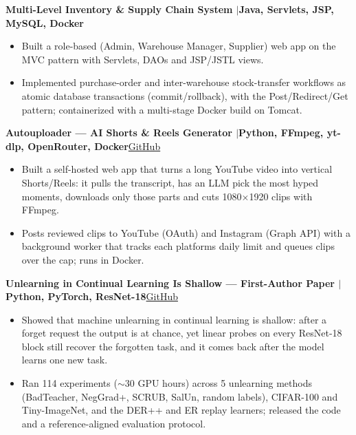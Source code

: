 \documentclass[10pt,a4paper]{article}
\newcommand{\entry}[2]{\par\textbf{#1}\hfill #2\par}
\newenvironment{points}{\vspace{-4pt}\begin{itemize}\setlength{\itemsep}{0pt}\setlength{\parskip}{0pt}\setlength{\topsep}{0pt}\setlength{\partopsep}{0pt}\setlength{\leftmargin}{12pt}}{\end{itemize}\vspace{-2pt}}
\newcommand{\sep}{\enspace$|$\enspace}
\begin{document}
\entry{Multi-Level Inventory \& Supply Chain System \textnormal{\sep Java, Servlets, JSP, MySQL, Docker}}{}
\begin{points}
  \item Built a role-based (Admin, Warehouse Manager, Supplier) web app on the MVC pattern with Servlets, DAOs and JSP/JSTL views.
  \item Implemented purchase-order and inter-warehouse stock-transfer workflows as atomic database transactions (commit/rollback), with the Post/Redirect/Get pattern; containerized with a multi-stage Docker build on Tomcat.
\end{points}

\entry{Autouploader --- AI Shorts \& Reels Generator \textnormal{\sep Python, FFmpeg, yt-dlp, OpenRouter, Docker}}{\href{https://github.com/Adarshmilan/autouploader}{GitHub}}
\begin{points}
  \item Built a self-hosted web app that turns a long YouTube video into vertical Shorts/Reels: it pulls the transcript, has an LLM pick the most hyped moments, downloads only those parts and cuts 1080$\times$1920 clips with FFmpeg.
  \item Posts reviewed clips to YouTube (OAuth) and Instagram (Graph API) with a background worker that tracks each platforms daily limit and queues clips over the cap; runs in Docker.
\end{points}
\entry{Unlearning in Continual Learning Is Shallow --- First-Author Paper \textnormal{\sep Python, PyTorch, ResNet-18}}{\href{https://github.com/Adarshmilan/CUL-continual-unlearning-}{GitHub}}
\begin{points}
  \item Showed that machine unlearning in continual learning is shallow: after a forget request the output is at chance, yet linear probes on every ResNet-18 block still recover the forgotten task, and it comes back after the model learns one new task.
  \item Ran 114 experiments ($\sim$30 GPU hours) across 5 unlearning methods (BadTeacher, NegGrad+, SCRUB, SalUn, random labels), CIFAR-100 and Tiny-ImageNet, and the DER++ and ER replay learners; released the code and a reference-aligned evaluation protocol.
\end{points}
\end{document}
